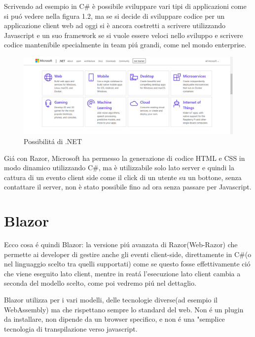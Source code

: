 Scrivendo ad esempio in C\# \`e possibile sviluppare vari tipi di applicazioni come si pu\'o vedere nella figura 1.2, ma se si decide di sviluppare codice per un applicazione client web ad oggi si \`e ancora costretti a scrivere utilizzando Javascript e un suo framework se si vuole essere veloci nello sviluppo e scrivere codice mantenibile specialmente in team pi\'u grandi, come nel mondo enterprise.

\begin{figure}[H]
\centerline{\includegraphics[scale=0.35]{figure/DotNetFrameworkCapabilities}}
\caption{Possibilit\'a di .NET}
\label{fig:DotNetCapabilities}
\end{figure}

Gi\'a con Razor\cite{razor}, Microsoft ha permesso la generazione di codice HTML e CSS in modo dinamico utilizzando C\#, ma \`e utilizzabile solo lato server e quindi la cattura di un evento client side come il click di un utente su un bottone, senza contattare il server, non \`e stato possibile fino ad ora senza passare per Javascript.

\section{Blazor}
Ecco cosa \'e quindi Blazor: la versione pi\'u avanzata di Razor(Web-Razor) che permette ai developer di gestire anche gli eventi client-side, direttamente in C\#(o nel linguaggio scelto tra quelli supportati) come se questo fosse effettivamente ci\'o che viene eseguito lato client, mentre in reat\'a l'esecuzione lato client cambia a seconda del modello scelto, come poi vedremo pi\'u nel dettaglio.

Blazor utilizza per i vari modelli, delle tecnologie diverse(ad esempio il WebAssembly) ma che rispettano sempre lo standard del web.
Non \'e un plugin da installare, non dipende da un browser specifico, e non \'e una "semplice tecnologia di transpilazione verso javascript.